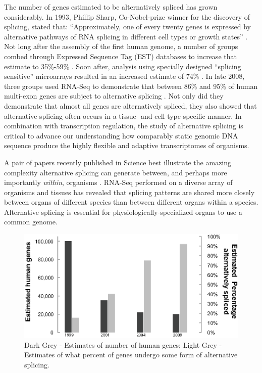     The number of genes estimated to be alternatively spliced has grown considerably. In 1993, Phillip Sharp, Co-Nobel-prize winner for the discovery of splicing, stated that: ``Approximately, one of every twenty genes is expressed by alternative pathways of RNA splicing in different cell types or growth states'' \cite{Sharp2014}. Not long after the assembly of the first human genome, a number of groups combed through Expressed Sequence Tag (EST) databases to increase that estimate to 35\%-59\% \citep{Modrek2002}. Soon after, analysis using specially designed ``splicing sensitive'' microarrays resulted in an increased estimate of 74\% \citep{Johnson2003}. In late 2008, three groups used RNA-Seq to demonstrate that between 86\% and 95\% of human multi-exon genes are subject to alternative splicing \citep{Pan2008, Wang2008, Sultan2008}. Not only did they demonstrate that almost all genes are alternatively spliced, they also showed that alternative splicing often occurs in a tissue- and cell type-specific manner. In combination with transcription regulation, the study of alternative splicing is critical to advance our understanding how comparably static genomic DNA sequence produce the highly flexible and adaptive transcriptomes of organisms.

    A pair of papers recently published in Science best illustrate the amazing complexity alternative splicing can generate between, and perhaps more importantly \textit{within}, organisms \citep{Barbosa-Morais2012,Merkin2012}. RNA-Seq performed on a diverse array of organisms and tissues has revealed that splicing patterns are shared more closely between organs of different species than between different organs within a species. Alternative splicing is essential for physiologically-specialized organs to use a common genome.

    \begin{figure} %
      \centering 
      \includegraphics{Figures/Intro/numberHumanGenesAndNumberSpliced}
      \caption[Estimates of number of human genes, and percentage alternatively spliced over time]
      {
      Dark Grey - Estimates of number of human genes; Light Grey - Estimates of what percent of genes undergo some form of alternative splicing.
      }
      \label{Intro:fig:numGenesAndNumSpliced}
      \end{figure}

